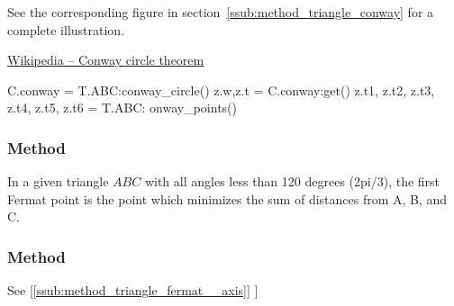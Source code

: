 \medskip
\noindent
See  the corresponding figure in section~\ref{ssub:method_triangle_conway} for a complete illustration.
\begin{flushright}
\small
\href{https://en.wikipedia.org/wiki/Conway_circle_theorem}{Wikipedia – Conway circle theorem}
\end{flushright}

\vspace{1em}

\begin{mybox}
\begin{tkzexample}
  C.conway = T.ABC:conway_circle()
  z.w,z.t  = C.conway:get() %
  z.t1, z.t2, z.t3, z.t4, z.t5, z.t6 = T.ABC: onway_points()
\end{tkzexample}
\end{mybox}

\subsubsection{Method }
\label{ssub:method_triangle_first_fermat_point}
In a given triangle $ABC$ with all angles less than  120 degrees (2pi/3), the first Fermat point  is the point  which minimizes the sum of distances from A, B, and C.


\begin{tkzexample}[latex=.5\textwidth]
\end{tkzexample}

\subsubsection{Method }
\label{ssub:method_triangle_second__fermat__point}
See  [\ref{ssub:method_triangle_fermat__axis}]
]

